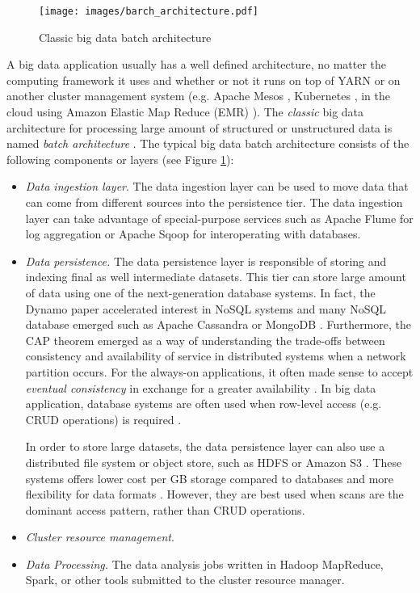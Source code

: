  \begin{figure}[ht!]
\texttt{[image: images/barch\_architecture.pdf]}
 \caption{Classic big data batch architecture}
\label{fig:batch_architecture}
\end{figure}

A big data application usually has a well defined architecture, no matter the computing framework it uses and whether or not it runs on top of YARN or on another cluster management system (e.g. Apache Mesos  \cite{apachemesosonline}, Kubernetes \cite{kubernetesonline}, in the cloud using Amazon Elastic Map Reduce (EMR) \cite{amazonemronline}). The \emph{classic} big data architecture for processing large amount of structured or unstructured data is named \emph{batch architecture} \cite{philosophydistributeddata, fastdataarchitecture, streamingbigdataprocessinginclouds}. The typical big data batch architecture consists of the following components or layers (see Figure \ref{fig:batch_architecture}):
\begin{itemize}
\item	 \emph{Data ingestion layer}. The data ingestion layer can be used to move data that can come from different sources into the persistence tier. The data ingestion layer can take advantage of special-purpose services such as Apache Flume \cite{apacheflumeonline} for log aggregation or Apache Sqoop \cite{apachesqooponline} for interoperating with databases.
\item \emph{Data persistence.} The data persistence layer is responsible of storing and indexing final as well intermediate datasets. This tier can store large amount of data using one of the next-generation database systems. In fact, the Dynamo \cite{dynamo} paper accelerated interest in NoSQL systems and many NoSQL database emerged such as Apache Cassandra \cite{apachecassandraonline} or MongoDB \cite{mongodbonline}. Furthermore, the CAP theorem emerged as a way of understanding the trade-offs between consistency and availability of service in distributed systems when a network partition occurs. For the always-on applications, it often made sense to accept \emph{eventual consistency} in exchange for a greater availability \cite{fastdataarchitecture}. In big data application, database systems are often used when row-level access (e.g. CRUD operations) is required \cite{fastdataarchitecture}.

In order to store large datasets, the data persistence layer can also use a distributed file system or object store, such as HDFS or Amazon S3 \cite{awss3online}. These systems offers lower cost per GB storage compared to databases and more flexibility for data formats \cite{fastdataarchitecture}. However, they are best used when scans are the dominant access pattern, rather than CRUD operations. 
\item  \emph{Cluster resource management}. 
\item  \emph{Data Processing.} The data analysis jobs written in Hadoop MapReduce, Spark, or other tools submitted to the cluster resource manager.
\end{itemize}

